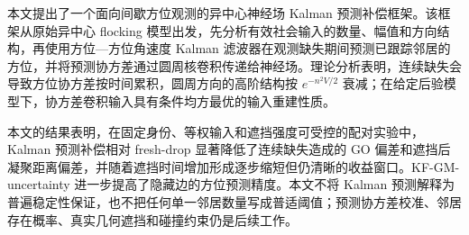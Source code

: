 \documentclass[UTF8,fontset=windows,11pt]{ctexart}
\begin{document}
本文提出了一个面向间歇方位观测的异中心神经场 Kalman 预测补偿框架。该框架从原始异中心 flocking 模型出发，先分析有效社会输入的数量、幅值和方向结构，再使用方位—方位角速度 Kalman 滤波器在观测缺失期间预测已跟踪邻居的方位，并将预测协方差通过圆周核卷积传递给神经场。理论分析表明，连续缺失会导致方位协方差按时间累积，圆周方向的高阶结构按 $e^{-n^2V/2}$ 衰减；在给定后验模型下，协方差卷积输入具有条件均方最优的输入重建性质。

本文的结果表明，在固定身份、等权输入和遮挡强度可受控的配对实验中，Kalman 预测补偿相对 fresh-drop 显著降低了连续缺失造成的 GO 偏差和遮挡后凝聚距离偏差，并随着遮挡时间增加形成逐步缩短但仍清晰的收益窗口。KF-GM-uncertainty 进一步提高了隐藏边的方位预测精度。本文不将 Kalman 预测解释为普遍稳定性保证，也不把任何单一邻居数量写成普适阈值；预测协方差校准、邻居存在概率、真实几何遮挡和碰撞约束仍是后续工作。
\end{document}
